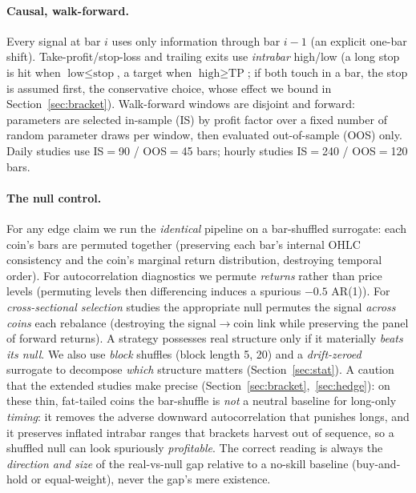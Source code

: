 \documentclass[12pt]{article}
\begin{document}
\paragraph{Causal, walk-forward.} Every signal at bar $i$ uses only information through bar $i-1$ (an explicit one-bar shift). Take-profit/stop-loss and trailing exits use \emph{intrabar} high/low (a long stop is hit when $\text{low}\leq\text{stop}$, a target when $\text{high}\geq\text{TP}$; if both touch in a bar, the stop is assumed first, the conservative choice, whose effect we bound in Section~\ref{sec:bracket}). Walk-forward windows are disjoint and forward: parameters are selected in-sample (IS) by profit factor over a fixed number of random parameter draws per window, then evaluated out-of-sample (OOS) only. Daily studies use IS$=$90 / OOS$=$45 bars; hourly studies IS$=$240 / OOS$=$120 bars.

\paragraph{The null control.} For any edge claim we run the \emph{identical} pipeline on a bar-shuffled surrogate: each coin's bars are permuted together (preserving each bar's internal OHLC consistency and the coin's marginal return distribution, destroying temporal order). For autocorrelation diagnostics we permute \emph{returns} rather than price levels (permuting levels then differencing induces a spurious $-0.5$ AR(1)). For \emph{cross-sectional selection} studies the appropriate null permutes the signal \emph{across coins} each rebalance (destroying the signal$\to$coin link while preserving the panel of forward returns). A strategy possesses real structure only if it materially \emph{beats its null}. We also use \emph{block} shuffles (block length 5, 20) and a \emph{drift-zeroed} surrogate to decompose \emph{which} structure matters (Section~\ref{sec:stat}). A caution that the extended studies make precise (Section~\ref{sec:bracket},~\ref{sec:hedge}): on these thin, fat-tailed coins the bar-shuffle is \emph{not} a neutral baseline for long-only \emph{timing}: it removes the adverse downward autocorrelation that punishes longs, and it preserves inflated intrabar ranges that brackets harvest out of sequence, so a shuffled null can look spuriously \emph{profitable}. The correct reading is always the \emph{direction and size} of the real-vs-null gap relative to a no-skill baseline (buy-and-hold or equal-weight), never the gap's mere existence.
\end{document}
